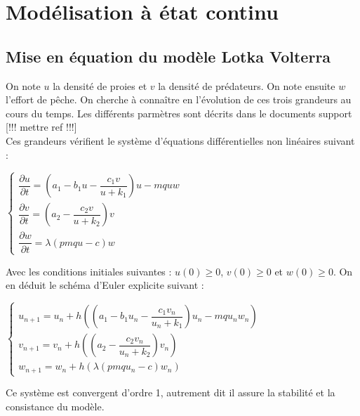 \documentclass[a4paper, 11pt]{report}%
\begin{document}
    \section{Modélisation à état continu}
        \subsection{Mise en équation du modèle Lotka Volterra}
        On note $u$ la densité de proies et $v$ la densité de prédateurs. On note ensuite $w$ l'effort de pêche. On cherche à connaître en l'évolution de ces trois grandeurs au cours du temps. Les différents parmètres sont décrits dans le documents support \cite{} [!!! mettre ref !!!]\\
        Ces grandeurs vérifient le système d'équations différentielles non linéaires suivant : 
        \begin{center}
        $ \left\{
            \begin{array}{ll}
                \dfrac{\partial u}{ \partial t} = \left( a_1 - b_1 u - \dfrac{c_1 v}{u+ k_1}  \right) u - mquw \\
                \dfrac{\partial v}{ \partial t} = \left( a_2 - \dfrac{c_2 v}{u+ k_2} \right) v \\
                \dfrac{\partial w}{ \partial t} = \lambda \left( pmqu - c \right) w
            \end{array}
        \right.$
        \end{center}
        Avec les conditions initiales suivantes :  $u(0) \geq 0$, $v(0) \geq 0$ et $w(0) \geq 0$.
        On en déduit le schéma d'Euler explicite suivant : 
        \begin{center}
        $ \left\{
            \begin{array}{ll}
                u_{n+1} = u_n + h \left( \left( a_1 - b_1 u_n - \dfrac{c_1 v_n}{u_n + k_1}  \right) u_n - mqu_n w_n \right)\\
                v_{n+1} = v_n + h \left( \left( a_2 - \dfrac{c_2 v_n}{u_n + k_2} \right) v_n \right) \\
                w_{n+1} = w_n + h \left( \lambda \left( pmq u_n - c \right) w_n \right)
            \end{array}
        \right.$
        \end{center}
        Ce système est convergent d'ordre 1, autrement dit il assure la stabilité et la consistance du modèle.
\end{document}
